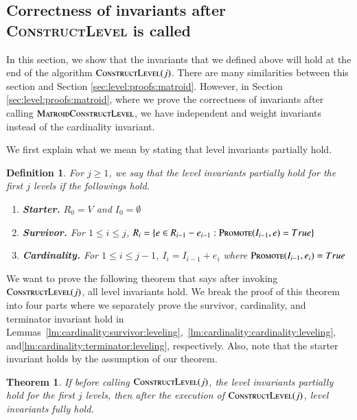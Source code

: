 \documentclass[11pt]{article}
\newtheorem{theorem}{Theorem}
\newtheorem{definition}{Definition}[section]
\newcommand{\constLevel}{\textsc{ConstructLevel}}
\newcommand{\suit}{\textsc{Promote}}
\newcommand{\MatroidConstLevel}{\textsc{MatroidConstructLevel}}
\newcommand{\replacementTester}{\textsc{Promote}}
\begin{document}
\subsection{Correctness of invariants after \constLevel{} is called}
In this section, we show that the invariants that we defined above will hold 
at the end of the algorithm $\constLevel{}(j)$. 
There are many similarities between this section and Section \ref{sec:level:proofs:matroid}.
However, in Section \ref{sec:level:proofs:matroid}, where we prove the correctness of invariants after calling $\MatroidConstLevel{}$, we have independent and weight invariants instead of the cardinality invariant.

We first explain what we mean by stating that level invariants partially hold. 


\begin{tcolorbox}[width=\linewidth, colback=white!80!gray,boxrule=0pt,frame hidden, sharp corners]
\begin{definition}
    For $j \ge 1$, we say that 
    \emph{the level invariants partially hold for the first $j$ levels} if the followings hold.
    \begin{enumerate}
        \item \textbf{Starter.} $R_0 = V$ and $I_0 = \emptyset$
        \item \textbf{Survivor.}  For $1 \leq i \le j$, $R_i = \{ e \in R_{i-1} - e_{i-1}: \replacementTester{}(I_{i-1}, e) = True\}$ 
        \item  \textbf{Cardinality.} For $1 \leq i \le j-1$, $I_i = I_{i-1} + e_i$ where $\suit{}(I_{i-1}, e_i)=True$
    \end{enumerate}
\end{definition}


\end{tcolorbox}




We want to prove the following theorem that says after invoking $\constLevel{}(j)$, 
all level invariants hold. 
We break the proof of this theorem into four parts where 
we separately prove the survivor, cardinality, and terminator invariant hold in Lemmas~\ref{lm:cardinality:survivor:leveling},~\ref{lm:cardinality:cardinality:leveling}, and\ref{lm:cardinality:terminator:leveling}, respectively. 
Also, note that the starter invariant holds by the assumption of our theorem.

\begin{theorem}
\label{thm:cardinality:invariants:leveling}
If before calling $\constLevel{}(j)$, the level invariants partially hold for the first $j$ levels,
then after the execution of $\constLevel{}(j)$, level invariants fully hold.
\end{theorem}
\end{document}
